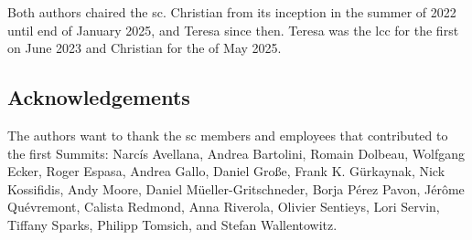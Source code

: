 \documentclass[
	a4paper, %
	10pt, %
	unnumberedsections, %
	twoside, %
]{LTJournalArticle}
\begin{document}
Both authors chaired the \gls{sc}. Christian from its
inception in the summer of 2022 until end of January 2025, and Teresa
since then. Teresa was the \gls{lcc} for the first
 on June 2023 and Christian for the
 of May 2025.

\subsection{Acknowledgements}

The authors want to thank the \gls{sc} members and 
employees that contributed to the first Summits:
Narcís Avellana,
Andrea Bartolini,
Romain Dolbeau,
Wolfgang Ecker,
Roger Espasa,
Andrea Gallo,
Daniel Große,
Frank K. Gürkaynak,
Nick Kossifidis,
Andy Moore,
Daniel Müeller-Gritschneder,
Borja Pérez Pavon,
Jérôme Quévremont,
Calista Redmond,
Anna Riverola,
Olivier Sentieys,
Lori Servin,
Tiffany Sparks,
Philipp Tomsich, and
Stefan Wallentowitz.



\printbibliography %

\end{document}
